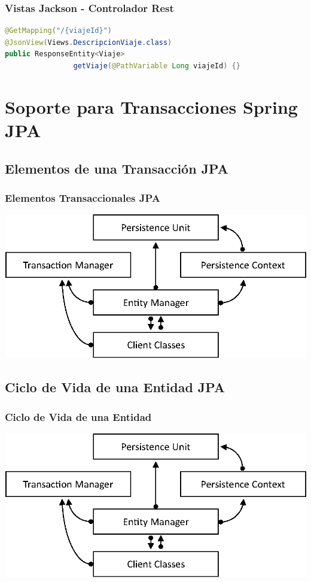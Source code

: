 \documentclass[a4paper,slidestop,xcolor=pst,blue]{beamer}
\begin{document}
\begin{frame}[c,fragile]
    \frametitle{Vistas Jackson - Controlador Rest}
\begin{lstlisting}[basicstyle=\small,language=Java]
@GetMapping("/{viajeId}")
@JsonView(Views.DescripcionViaje.class)
public ResponseEntity<Viaje>
                getViaje(@PathVariable Long viajeId) {}
\end{lstlisting}
\end{frame}

\section{Soporte para Transacciones Spring JPA}

\subsection{Elementos de una Transacción JPA}

\begin{frame}[c]
    \frametitle{Elementos Transaccionales JPA}
    \begin{center}
        \includegraphics[width=0.5\linewidth,keepaspectratio=true]{images/jpa/jpaElements.eps}
    \end{center}
\end{frame}

\subsection{Ciclo de Vida de una Entidad JPA}

\begin{frame}[c]
    \frametitle{Ciclo de Vida de una Entidad}
    \begin{center}
        \includegraphics[width=0.8\linewidth,keepaspectratio=true]{images/jpa/jpaElements.eps}
    \end{center}
\end{frame}
\end{document}
